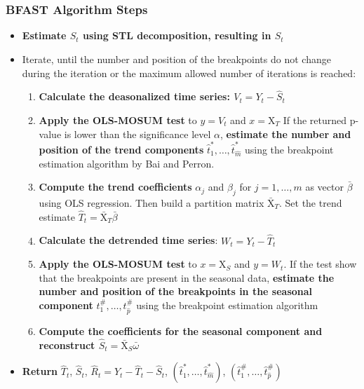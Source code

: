 \documentclass[presentation.tex]{subfiles}
\begin{document}
\begin{frame}
  \frametitle{BFAST Algorithm Steps}
  \begin{itemize}
  \item \textbf{Estimate $S_t$ using STL decomposition, resulting in $\hat{S}_t$}
  \item Iterate, until the number and position of the breakpoints do
    not change during the iteration or the maximum allowed number of iterations
    is reached:
    \begin{enumerate}
    \item \textbf{Calculate the deasonalized time series: $V_t = Y_t - \hat{S}_t$}
    \item \textbf{Apply the OLS-MOSUM test} to $y = V_t$ and $x = \mathrm{X}_T$
      If the returned p-value is lower than the significance level $\alpha$,
      \textbf{estimate the number and position of the trend components}
      $\hat{t}_1^*,\hdots, \hat{t}_{\hat{m}}^*$
      using the breakpoint estimation algorithm by Bai and Perron.
    \item \textbf{Compute the trend coefficients} $\alpha_j$ and $\beta_j$
       for $j = 1, \hdots, m$ as vector $\bar{\beta}$ using OLS regression. Then build
       a partition matrix $\bar{\mathrm{X}}_T$. Set the trend estimate
       $\hat{T}_t = \bar{\mathrm{X}}_T \bar{\beta}$
    \item \textbf{Calculate the detrended time series}: $W_t = Y_t - \hat{T}_t$
    \item \textbf{Apply the OLS-MOSUM test} to $x = \mathrm{X}_S$ and $y = W_t$.
    If the test show that the breakpoints are present in the
      seasonal data, \textbf{estimate the number and position of the
      breakpoints in the seasonal component} $t_1^{\#},\hdots, t_{\hat{p}}^{\#}$ using
      the breakpoint estimation algorithm 
    \item \textbf{Compute the coefficients for the seasonal component
      and reconstruct $\hat{S}_t = \bar{\mathrm{X}}_S \bar{\omega}$}
  \end{enumerate}
\item \textbf{Return} $\hat{T}_t$, $\hat{S}_t$, $\hat{R}_t = Y_t - \hat{T}_t -\hat{S}_t$,
  $(\hat{t}_1^*, \hdots, \hat{t}_{\hat{m}}^*)$, $(\hat{t}_1^{\#}, \hdots, \hat{t}_{\hat{p}}^{\#})$
\end{itemize}

\end{frame}
\end{document}
